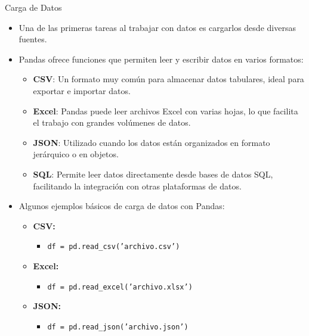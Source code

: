 \documentclass[spanish]{beamer}
\begin{document}
\begin{frame}{Carga de Datos}
    \begin{itemize}
        \item Una de las primeras tareas al trabajar con datos es cargarlos desde diversas fuentes.
        \item Pandas ofrece funciones que permiten leer y escribir datos en varios formatos:
        \begin{itemize}
            \item \textbf{CSV}: Un formato muy común para almacenar datos tabulares, ideal para exportar e importar datos.
            \item \textbf{Excel}: Pandas puede leer archivos Excel con varias hojas, lo que facilita el trabajo con grandes volúmenes de datos.
            \item \textbf{JSON}: Utilizado cuando los datos están organizados en formato jerárquico o en objetos.
            \item \textbf{SQL}: Permite leer datos directamente desde bases de datos SQL, facilitando la integración con otras plataformas de datos.
        \end{itemize}
        \item Algunos ejemplos básicos de carga de datos con Pandas:
        \begin{itemize}
            \item \textbf{CSV:}
            \begin{itemize}
                \item \texttt{df = pd.read\_csv('archivo.csv')}
            \end{itemize}
            \item \textbf{Excel:}
            \begin{itemize}
                \item \texttt{df = pd.read\_excel('archivo.xlsx')}
            \end{itemize}
            \item \textbf{JSON:}
            \begin{itemize}
                \item \texttt{df = pd.read\_json('archivo.json')}
            \end{itemize}
        \end{itemize}
    \end{itemize}
\end{frame}
\end{document}
